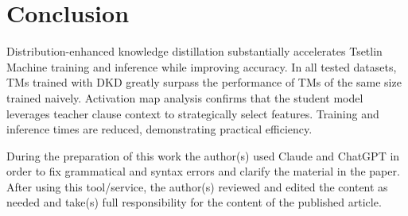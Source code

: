 \documentclass[sn-mathphys-num]{sn-jnl}%
\theoremstyle{thmstyleone}%
\theoremstyle{thmstyletwo}%
\theoremstyle{thmstylethree}%
\begin{document}
\section{Conclusion}
Distribution-enhanced knowledge distillation substantially accelerates Tsetlin Machine training and inference while improving accuracy. In all tested datasets, TMs trained with DKD greatly surpass the performance of TMs of the same size trained naively.
Activation map analysis confirms that the student model leverages teacher clause context to strategically select features. Training and inference times are reduced, demonstrating practical efficiency.

During the preparation of this work the author(s) used Claude and ChatGPT in order to fix grammatical and syntax errors and clarify the material in the paper. After using this tool/service, the author(s) reviewed and edited the content as needed and take(s) full responsibility for the content of the published article.


% 






\end{document}
